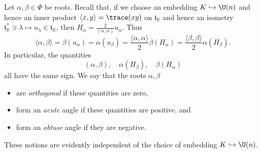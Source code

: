 \documentclass[reqno]{amsart} 
\begin{document}
Let $\alpha,\beta \in \Phi$ be roots.  Recall that, if we choose an embedding $K \hookrightarrow \U(n)$ and hence an inner product $\langle x,y \rangle = \trace( x y)$ on $\mathfrak{t}_{\mathbb{R}}$ and hence an isometry $\mathfrak{t}_{\mathbb{R}}^* \ni \lambda \mapsto u_\lambda \in \mathfrak{t}_{\mathbb{R}}$, then $H_\alpha = \frac{2}{( \alpha, \alpha )} u_\alpha$.  Thus
\begin{equation}\label{eq:identity-alpha-beta-inner-prod-vs-H-stuff}
  \langle \alpha, \beta  \rangle
  =
  \beta(u_\alpha)
  =
  \alpha(u_\beta)
  =
  \frac{\langle\alpha,\alpha\rangle}{2}
  \beta(H_\alpha)
  = 
  \frac{\langle\beta,\beta\rangle}{2}
  \alpha(H_\beta).
\end{equation}
In particular, the quantities
\begin{equation}\label{eq:}
  (\alpha,\beta),
  \quad
  \alpha(H_\beta),
  \quad 
  \beta(H_\alpha)
\end{equation}
all have the same sign.  We say that the roots $\alpha,\beta$
\begin{itemize}
\item are \emph{orthogonal} if these quantities are zero,
\item form an \emph{acute} angle if these quantities are positive, and
\item form an \emph{obtuse} angle if they are negative.
\end{itemize}
These notions are evidently independent of the choice of embedding $K \hookrightarrow \U(n)$.
\end{document}
